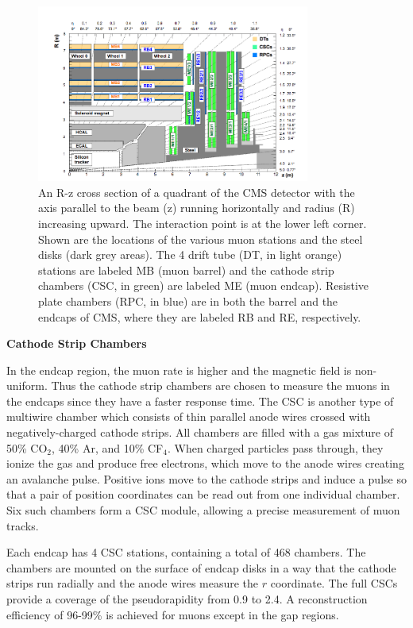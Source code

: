 \documentclass[thesis.tex]{subfiles}
\begin{document}
\begin{figure}[hbt]
	\centering
	\includegraphics[width=0.8\textwidth]{plot/DT.png}
	\caption{An R-z cross section of a quadrant of the CMS detector with the axis parallel to the beam (z) running horizontally and radius (R) increasing upward.  The interaction point is at the lower left corner. 
	 Shown are the locations of the various muon stations and the steel disks (dark grey areas). The 4 drift tube (DT, in light orange) stations are labeled MB (muon barrel) and the cathode strip chambers (CSC, in green) are labeled ME (muon endcap).              Resistive plate chambers (RPC, in blue) are in both the barrel and the endcaps of CMS, where they are labeled RB and RE, respectively.}
	\label{fig:DT}
\end{figure}

\noindent \textbf{Cathode Strip Chambers}

In the endcap region, the muon rate is higher and the magnetic field is non-uniform.
Thus the cathode strip chambers are chosen to measure the muons in the endcaps since they have a faster response time. 
The CSC is another type of multiwire chamber which consists of thin parallel anode wires crossed with negatively-charged cathode strips.
All chambers are filled with a gas mixture of 50\% CO$_2$, 40\% Ar, and 10\% CF$_4$.
When charged particles pass through, they ionize the gas and produce free electrons, which move to the anode wires creating an avalanche pulse.
Positive ions move to the cathode strips and induce a pulse so that a pair of position coordinates can be read out from one individual chamber.
Six such chambers form a CSC module, allowing a precise measurement of muon tracks. 

Each endcap has 4 CSC stations, containing a total of 468 chambers.
The chambers are mounted on the surface of endcap disks in a way that the cathode strips run radially and the anode wires measure the $r$ coordinate. 
The full CSCs provide a coverage of the pseudorapidity from 0.9 to 2.4.
A reconstruction efficiency of 96-99\% is achieved for muons except in the gap regions.
\end{document}
